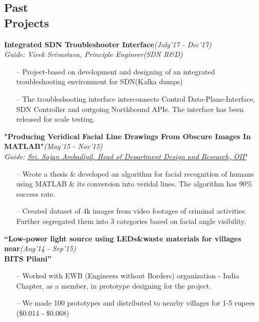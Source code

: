 \documentclass[margin,line]{templates/resume}
\newcommand{\myhref}[3][blue]{\href{#2}{\color{#1}{#3}}}
\newcommand{\compresslist}{%
\setlength{\itemsep}{3pt}%
\setlength{\parskip}{0pt}%
\setlength{\parsep}{0pt}%
}
\begin{document}
\begin{resume}
\section{\mysidestyle Past\\Projects}
\textsf{\textbf{Integrated SDN Troubleshooter Interface}}\hfill\textit{\small(July'17 - Dec'17)}
\\ {\textit{Guide: {Vivek Srivastava, Principle Engineer(SDN R\&D)}}}\hfill{\myhref[darkblue]{https://esha-singh.github.io/\#mpi}{Web}}
\vspace{0.05cm}
\begin{itemize}[leftmargin=*]\compresslist
\item[--]Project-based on development and designing of an integrated troubleshooting environment for SDN(Kafka dumps)
\item[--]The troubleshooting interface interconnects Control Data-Plane-Interface, SDN Controller and outgoing Northbound APIs. The interface has been released for scale testing.
\end{itemize}

\newpage
\vspace{-0.2cm}    
\textsf{\textbf{"Producing Veridical Facial Line Drawings From Obscure Images In MATLAB"}}\hfill\textit{\small(May'15 - Nov'15)}
\\ {\textit{Guide: \href{http://www.cdit.org/who-who}{ Sri. Sajan Ambadiyil, Head of Department Design and Research, OIP}}} \hfill{\myhref[darkblue]{https://esha-singh.github.io/\#mpi}{Web}}
\normalsize
\vspace{0.05cm}
\begin{itemize}[leftmargin=*]\compresslist
  \item[--]Wrote a thesis \& developed an algorithm for facial recognition of humans using MATLAB \& its conversion into veridal lines. The algorithm has 90\% success rate.
\item[--]Created dataset of 4k images from video footages of criminal activities. Further segregated them into 3 categories based on facial angle visibility. 
\end{itemize}

\vspace{-0.2cm}    
\textsf{\textbf{“Low-power light source using LEDs\&waste materials for villages near}}\hfill\textit{\small(Aug'14 - Sep'15)}\\
\textsf{\textbf{ BITS Pilani”}}
\normalsize
\vspace{0.05cm}
\begin{itemize}[leftmargin=*]\compresslist
    \item[--]Worked with EWB (Engineers without Borders) organization - India Chapter, as a member, in prototype designing for the project.
    \item[--]We made 100 prototypes and distributed to nearby villages for 1-5 rupees (\$0.014 - \$0.068) 
\end{itemize}


\end{resume}
\end{document}
